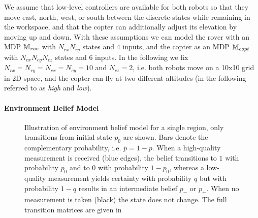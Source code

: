 \documentclass[draft,conference]{IEEEtran}
\begin{document}
We assume that low-level controllers are available for both robots so that they move east, north, west, or south between the discrete states while remaining in the workspace, and that the copter can additionally adjust its elevation by moving up and down. With these assumptions we can model the rover with an MDP $\mathbb{M}_{rov}$ with $N_{rx} N_{ry}$ states and $4$ inputs, and the copter as an MDP $\mathbb{M}_{copt}$ with $N_{cx} N_{cy} N_{cz}$ states and $6$ inputs. In the following we fix $N_{rx} = N_{ry} = N_{cx} = N_{cy} = 10$ and $N_{cz} = 2$, i.e. both robots move on a 10x10 grid in 2D space, and the copter can fly at two different altitudes (in the following referred to as \emph{high} and \emph{low}).


\paragraph{Environment Belief Model}

\begin{figure}
  \begin{center}
  \end{center}
  \caption{Illustration of environment belief model for a single region, only transitions from initial state $p_0$ are shown. Bars denote the complementary probability, i.e. $\bar p = 1-p$. When a high-quality measurement is received (blue edges), the belief transitions to $1$ with probability $p_0$ and to $0$ with probability $1-p_0$, whereas a low-quality measurement yields certainty with probability $q$ but with probability $1-q$ results in an intermediate belief $p_-$ or $p_+$. When no measurement is taken (black) the state does not change. The full transition matrices are given in}
  \label{fig:envmdp}
\end{figure}
\end{document}
